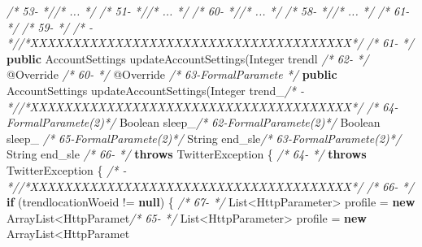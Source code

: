 \documentclass[
]{article}
\newenvironment{Shaded}{\begin{snugshade}}{\end{snugshade}}
\newcommand{\AttributeTok}[1]{\textcolor[rgb]{0.77,0.63,0.00}{#1}}
\newcommand{\BuiltInTok}[1]{#1}
\newcommand{\CommentTok}[1]{\textcolor[rgb]{0.56,0.35,0.01}{\textit{#1}}}
\newcommand{\FunctionTok}[1]{\textcolor[rgb]{0.00,0.00,0.00}{#1}}
\newcommand{\KeywordTok}[1]{\textcolor[rgb]{0.13,0.29,0.53}{\textbf{#1}}}
\newcommand{\NormalTok}[1]{#1}
\begin{document}
\begin{landscape}
\begin{Shaded}
\begin{Highlighting}[]
\CommentTok{/* 53-                 *//* ...  */}                                                     \CommentTok{/* 51-                 *//* ...  */}                                                     
\CommentTok{/* 60-                 *//* ...  */}                                                     \CommentTok{/* 58-                 *//* ...  */}                                                     
\CommentTok{/* 61-                 */}                                                               \CommentTok{/* 59-                 */}                                                               
\CommentTok{/*   -                 *//*XXXXXXXXXXXXXXXXXXXXXXXXXXXXXXXXXXXXXX*/}                     \CommentTok{/* 61-                 */}    \KeywordTok{public}\NormalTok{ AccountSettings }\FunctionTok{updateAccountSettings}\NormalTok{(}\BuiltInTok{Integer}\NormalTok{ trendl}
\CommentTok{/* 62-                 */}    \AttributeTok{@Override}                                                  \CommentTok{/* 60-                 */}    \AttributeTok{@Override}                                                  
\CommentTok{/* 63-FormalParamete   */}    \KeywordTok{public}\NormalTok{ AccountSettings }\FunctionTok{updateAccountSettings}\NormalTok{(}\BuiltInTok{Integer}\NormalTok{ trend_}\CommentTok{/*   -                 *//*XXXXXXXXXXXXXXXXXXXXXXXXXXXXXXXXXXXXXX*/}                     
\CommentTok{/* 64-FormalParamete(2)*/}                                                 \BuiltInTok{Boolean}\NormalTok{ sleep_}\CommentTok{/* 62-FormalParamete(2)*/}                                                 \BuiltInTok{Boolean}\NormalTok{ sleep_}
\CommentTok{/* 65-FormalParamete(2)*/}                                                 \BuiltInTok{String}\NormalTok{ end_sle}\CommentTok{/* 63-FormalParamete(2)*/}                                                 \BuiltInTok{String}\NormalTok{ end_sle}
\CommentTok{/* 66-                 */}            \KeywordTok{throws}\NormalTok{ TwitterException \{                          }\CommentTok{/* 64-                 */}            \KeywordTok{throws}\NormalTok{ TwitterException \{                          }
\CommentTok{/*   -                 *//*XXXXXXXXXXXXXXXXXXXXXXXXXXXXXXXXXXXXXX*/}                     \CommentTok{/* 66-                 */}        \KeywordTok{if}\NormalTok{ (trendlocationWoeid != }\KeywordTok{null}\NormalTok{) \{                      }
\CommentTok{/* 67-                 */}        \BuiltInTok{List}\NormalTok{<HttpParameter> profile = }\KeywordTok{new} \BuiltInTok{ArrayList}\NormalTok{<HttpParamet}\CommentTok{/* 65-                 */}        \BuiltInTok{List}\NormalTok{<HttpParameter> profile = }\KeywordTok{new} \BuiltInTok{ArrayList}\NormalTok{<HttpParamet}

\end{Highlighting}
\end{Shaded}
\end{landscape}
\end{document}
